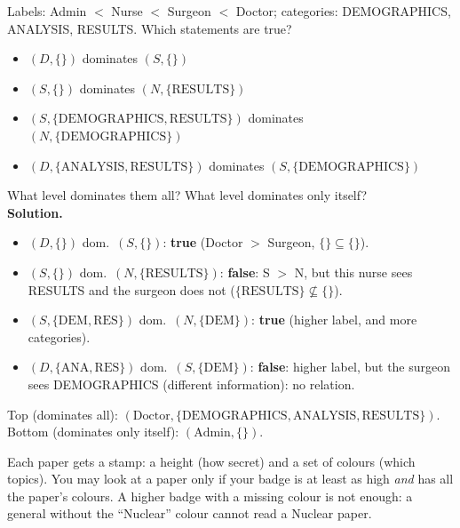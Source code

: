 \begin{exbox}[title={Exercise --- Dominance}]
Labels: Admin $<$ Nurse $<$ Surgeon $<$ Doctor; categories: DEMOGRAPHICS, ANALYSIS,
RESULTS. Which statements are true?
\begin{itemize}
  \item $(D, \{\})$ dominates $(S, \{\})$
  \item $(S, \{\})$ dominates $(N, \{\text{RESULTS}\})$
  \item $(S, \{\text{DEMOGRAPHICS}, \text{RESULTS}\})$ dominates
        $(N, \{\text{DEMOGRAPHICS}\})$
  \item $(D, \{\text{ANALYSIS}, \text{RESULTS}\})$ dominates
        $(S, \{\text{DEMOGRAPHICS}\})$
\end{itemize}
What level dominates them all? What level dominates only itself? \\[3pt]
\textbf{Solution.}
\begin{itemize}
  \item $(D, \{\})$ dom.\ $(S, \{\})$: \textbf{true} (Doctor $>$ Surgeon, $\{\} \subseteq \{\}$).
  \item $(S, \{\})$ dom.\ $(N, \{\text{RESULTS}\})$: \textbf{false}: S $>$ N, but this nurse sees
        RESULTS and the surgeon does not ($\{\text{RESULTS}\} \not\subseteq \{\}$).
  \item $(S, \{\text{DEM}, \text{RES}\})$ dom.\ $(N, \{\text{DEM}\})$: \textbf{true} (higher label,
        and more categories).
  \item $(D, \{\text{ANA}, \text{RES}\})$ dom.\ $(S, \{\text{DEM}\})$: \textbf{false}: higher
        label, but the surgeon sees DEMOGRAPHICS (different information): no relation.
\end{itemize}
Top (dominates all): $(\text{Doctor}, \{\text{DEMOGRAPHICS}, \text{ANALYSIS},
\text{RESULTS}\})$. Bottom (dominates only itself): $(\text{Admin}, \{\})$.
\end{exbox}

\begin{goatbox}
Each paper gets a stamp: a height (how secret) and a set of colours (which topics). You may look
at a paper only if your badge is at least as high \emph{and} has all the paper's colours. A
higher badge with a missing colour is not enough: a general without the ``Nuclear'' colour cannot
read a Nuclear paper.
\end{goatbox}

